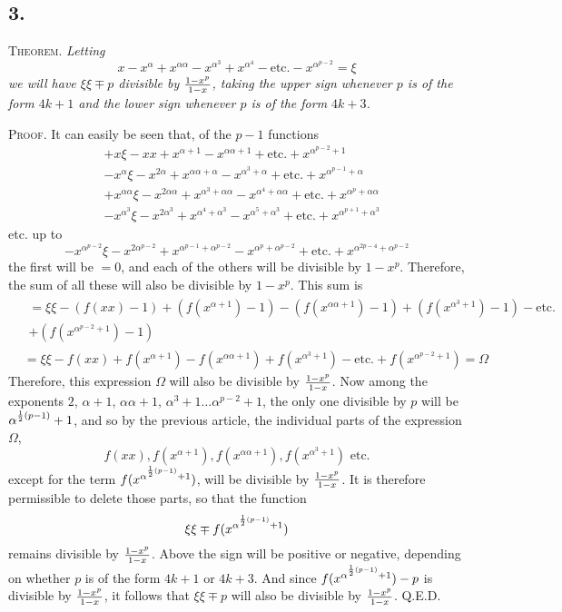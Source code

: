 \documentclass[twoside,12pt]{memoir}
\let\oldfrac\frac
\def\frac#1#2{\mathchoice{\tfrac{#1}{#2}}{\oldfrac{#1}{#2}}{\genfrac{}{}{}{2}{#1}{#2\mathstrut}}{\genfrac{}{}{}{3}{#1}{#2\mathstrut}}}
\begin{document}
\subsection*{3.}

\textsc{Theorem.} \textit{Letting}
\[x-x^{\alpha}+x^{\alpha \alpha}-x^{\alpha^{3}}+x^{\alpha^{4}}-\text{etc{.}}-x^{\alpha^{p-2}}=\xi\]
\textit{we will have \(\xi \xi \mp p\) divisible by \(\frac{1-x^{p}}{1- x}\), taking the upper sign whenever \(p\) is of the form \(4k+1\) and the lower sign whenever \(p\) is of the form \(4k+3\).}

\textsc{Proof.} It can easily be seen that, of the \(p-1\) functions
\[\begin{aligned}
& +x \xi-x x+x^{\alpha+1}-x^{\alpha \alpha+1}+\text{etc{.}}+x^{\alpha^{p-2}+1} \\
& -x^{\alpha} \xi-x^{2 \alpha}+x^{\alpha \alpha+\alpha}-x^{\alpha^{3}+\alpha}+\text{etc{.}}+x^{\alpha^{p-1}+\alpha} \\
& +x^{\alpha \alpha} \xi-x^{2 \alpha \alpha}+x^{\alpha^{3}+\alpha \alpha}-x^{\alpha^{4}+\alpha \alpha}+\text{etc{.}}+x^{\alpha^{p}+\alpha \alpha} \\
& -x^{\alpha^{3}} \xi-x^{2 \alpha^{3}}+x^{\alpha^{4}+\alpha^{3}}-x^{\alpha^{5}+\alpha^{3}}+\text{etc{.}}+x^{\alpha^{p+1}+\alpha^{3}}
\end{aligned}\]
etc{.} up to
\[-x^{\alpha^{p-2}} \xi-x^{2 \alpha^{p-2}}+x^{\alpha^{p-1}+\alpha^{p-2}}-x^{\alpha^{p}+\alpha^{p-2}}+\text{etc{.}}+x^{\alpha^{2 p-4}+\alpha^{p-2}}\]
the first will be \(=0\), and each of the others will be divisible by \(1-x^{p}\). Therefore, the sum of all these will also be divisible by \(1-x^{p}\).  This sum is
\[\begin{aligned}
&\begin{gathered}=\xi \xi-(f(x x)-1)+(f(x^{\alpha+1})-1)-(f(x^{\alpha \alpha+1})-1)+(f(x^{\alpha^{3}+1})-1)-\text{etc{.}}\\
+(f(x^{\alpha^{p-2}+1})-1) \end{gathered}\\
&=\xi \xi-f(x x)+f(x^{\alpha+1})-f(x^{\alpha \alpha+1})+f(x^{\alpha^{3}+1})-\text{etc{.}}+f(x^{\alpha^{p-2}+1})=\Omega
\end{aligned}\]
Therefore, this expression \(\Omega\) will also be divisible by \(\frac{1-x^{p}}{1-x}\). Now among the exponents \(2\), \(\alpha+1\), \(\alpha \alpha+1\), \(\alpha^{3}+1 \ldots \alpha^{p-2}+1\), the only one divisible by \(p\) will be \(\alpha^{\frac{1}{2}(p-1)}+1\), and so by the previous article, the individual parts of the expression \(\Omega\),
\[f(x x), f(x^{\alpha+1}), f(x^{\alpha \alpha+1}), f(x^{\alpha^{3}+1}) \text{ etc{.}}\]
except for the term \(f(x^{\alpha^{\frac{1}{2}(p-1)}+1})\), will be divisible by \(\frac{1-x^{p}}{1-x}\). It is therefore permissible to delete those parts, so that the function
\[\xi \xi \mp f(x^{\alpha^{\frac{1}{2}(p-1)}+1})\]
remains divisible by \(\frac{1-x^{p}}{1-x}\). Above the sign will be positive or negative, depending on whether \(p\) is of the form \(4k+1\) or \(4k+3\).  And since \(f(x^{\alpha^{\frac{1}{2}(p-1)}+1})-p\) is divisible by \(\frac{1-x^{p}}{1-x}\), it follows that \(\xi \xi \mp p\) will also be divisible by \(\frac{1-x^{p}}{1-x}\). Q.E.D.
\end{document}
